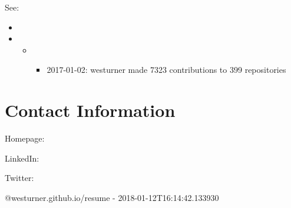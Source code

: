 \documentclass[letter,,openany,oneside,english]{sphinxhowto}
\begin{document}
See:
\begin{itemize}
\item {} 

\item {} 
\begin{itemize}
\item {} 
\begin{itemize}
\item {} 
2017-01-02: \sphinxquotedblleft{}westurner made 7323 contributions to 399 repositories\sphinxquotedblright{}

\end{itemize}

\end{itemize}

\end{itemize}


\section{Contact Information}
\label{\detokenize{resume:contact-information}}
\begin{DUlineblock}{0em}
\item[] Homepage: 
\item[] LinkedIn: 
\item[] Twitter: 
\end{DUlineblock}

@westurner.github.io/resume - 2018-01-12T16:14:42.133930

\renewcommand{\indexname}{Index}
\end{document}
